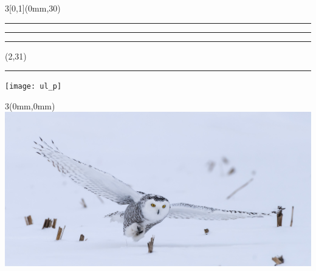 \begingroup

\textblockorigin{0mm}{0mm}
\setlength{\parindent}{0mm}
\setlength{\banderougewidth}{2\TPHorizModule}
\setlength{\banderougeheight}{\TPVertModule}
\setlength{\bandeorwidth}{\TPHorizModule}
\setlength{\bandeorheight}{\banderougeheight}
\setlength{\imageheight}{29\TPVertModule}
\setlength{\imagewidth}{3\TPHorizModule}
\setlength{\logoheight}{2.5\TPVertModule}
\setlength{\gapwidth}{0.75pt}
\addtolength{\bandeorwidth}{-\gapwidth}
\addtolength{\imageheight}{-\gapwidth}

\begin{frame}[plain]
  \begin{textblock*}{3\TPHorizModule}[0,1](0mm,30\TPVertModule)
    \textcolor{rouge}{\rule{\banderougewidth}{\banderougeheight}}%
    \rule{\gapwidth}{0pt}%
    \textcolor{or}{\rule{\bandeorwidth}{\bandeorheight}}           %
  \end{textblock*}

  \begin{textblock*}{\TPHorizModule}(2\TPHorizModule,31\TPVertModule)
    \rule{\gapwidth}{0pt}%
    \texttt{[image: ul\_p]}
  \end{textblock*}

  \begin{textblock*}{3\TPHorizModule}(0mm,0mm)
    \includegraphics[height=\imageheight,width=\imagewidth]{Fotolia_99831160.jpg}
  \end{textblock*}



\end{frame}
